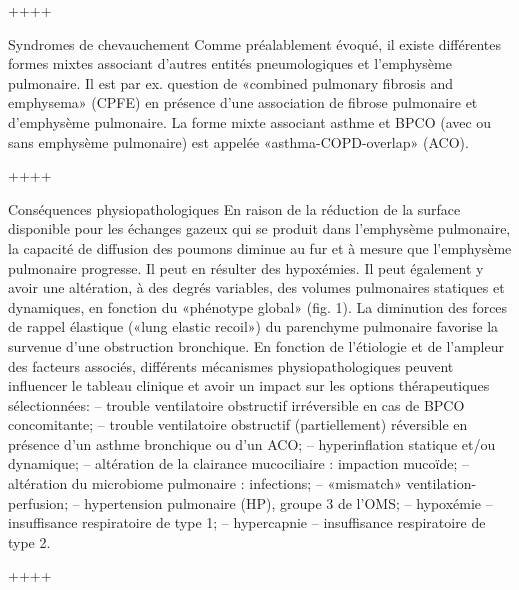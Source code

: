 \documentclass[12pt,]{article}
\begin{document}
++++

Syndromes de chevauchement Comme préalablement évoqué, il existe
différentes formes mixtes associant d'autres entités pneumologiques et
l'emphysème pulmonaire. Il est par ex. question de «combined pulmonary
fibrosis and emphysema» (CPFE) en présence d'une association de fibrose
pulmonaire et d'emphysème pulmonaire. La forme mixte associant asthme et
BPCO (avec ou sans emphysème pulmonaire) est appelée
«asthma-COPD-overlap» (ACO).

++++

Conséquences physiopathologiques En raison de la réduction de la surface
disponible pour les échanges gazeux qui se produit dans l'emphysème
pulmonaire, la capacité de diffusion des poumons diminue au fur et à
mesure que l'emphysème pulmonaire progresse. Il peut en résulter des
hypoxémies. Il peut également y avoir une altération, à des degrés
variables, des volumes pulmonaires statiques et dynamiques, en fonction
du «phénotype global» (fig. 1). La diminution des forces de rappel
élastique («lung elastic recoil») du parenchyme pulmonaire favorise la
survenue d'une obstruction bronchique. En fonction de l'étiologie et de
l'ampleur des facteurs associés, différents mécanismes
physiopathologiques peuvent influencer le tableau clinique et avoir un
impact sur les options thérapeutiques sélectionnées: -- trouble
ventilatoire obstructif irréversible en cas de BPCO concomitante; --
trouble ventilatoire obstructif (partiellement) réversible en présence
d'un asthme bronchique ou d'un ACO; -- hyperinflation statique et/ou
dynamique; -- altération de la clairance mucociliaire : impaction
mucoïde; -- altération du microbiome pulmonaire : infections; --
«mismatch» ventilation-perfusion; -- hypertension pulmonaire (HP),
groupe 3 de l'OMS; -- hypoxémie -- insuffisance respiratoire de type 1;
-- hypercapnie -- insuffisance respiratoire de type 2.

++++
\end{document}

